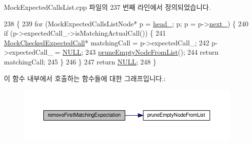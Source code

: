 Mock\+Expected\+Calls\+List.\+cpp 파일의 237 번째 라인에서 정의되었습니다.


\begin{DoxyCode}
238 \{
239     \textcolor{keywordflow}{for} (MockExpectedCallsListNode* p = \hyperlink{class_mock_expected_calls_list_a18290c3c0a206882dd8e0d9f446e2fe6}{head\_}; p; p = p->\hyperlink{class_mock_expected_calls_list_1_1_mock_expected_calls_list_node_aaae452a372ae14c06a6d5d252df73725}{next\_}) \{
240         \textcolor{keywordflow}{if} (p->expectedCall\_->isMatchingActualCall()) \{
241             \hyperlink{class_mock_checked_expected_call}{MockCheckedExpectedCall}* matchingCall = p->expectedCall\_;
242             p->expectedCall\_ = \hyperlink{openavb__types__base__pub_8h_a070d2ce7b6bb7e5c05602aa8c308d0c4}{NULL};
243             \hyperlink{class_mock_expected_calls_list_aeb4c1dd9901800365e942770b132c94b}{pruneEmptyNodeFromList}();
244             \textcolor{keywordflow}{return} matchingCall;
245         \}
246     \}
247     \textcolor{keywordflow}{return} \hyperlink{openavb__types__base__pub_8h_a070d2ce7b6bb7e5c05602aa8c308d0c4}{NULL};
248 \}
\end{DoxyCode}


이 함수 내부에서 호출하는 함수들에 대한 그래프입니다.\+:
\nopagebreak
\begin{figure}[H]
\begin{center}
\leavevmode
\includegraphics[width=350pt]{class_mock_expected_calls_list_ac8726365c168eec6edba33716889bc69_cgraph}
\end{center}
\end{figure}




